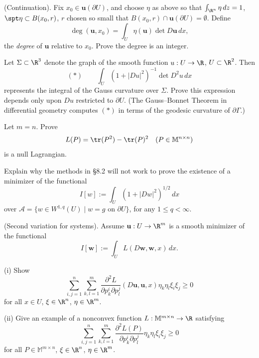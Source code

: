 \begin{exercise}
(Continuation). Fix $x_0 \in \mathbf{u}(\partial U)$, and choose $\eta$ as above so that $\int_{\R^n} \eta\, dz = 1$, $\spt \eta \subset B(x_0, r)$, $r$ chosen so small that $B(x_0, r) \cap \mathbf{u}(\partial U) = \emptyset$. Define
\[
\deg(\mathbf{u}, x_0) = \int_U \eta(\mathbf{u}) \det D\mathbf{u}\, dx,
\]
the \textit{degree} of $\mathbf{u}$ relative to $x_0$. Prove the degree is an integer.
\end{exercise}

\begin{exercise}
Let $\Sigma \subset \R^3$ denote the graph of the smooth function $u : U \to \R$, $U \subset \R^2$. Then
\[
(*) \qquad \int_U (1 + |Du|^2)^{-1} \det D^2u\, dx
\]
represents the integral of the Gauss curvature over $\Sigma$. Prove this expression depends only upon $Du$ restricted to $\partial U$. (The Gauss--Bonnet Theorem in differential geometry computes $(*)$ in terms of the geodesic curvature of $\partial\Gamma$.)
\end{exercise}

\begin{exercise}
Let $m = n$. Prove
\[
L(P) = \tr(P^2) - \tr(P)^2 \quad (P \in \mathbb{M}^{n \times n})
\]
is a null Lagrangian.
\end{exercise}

\begin{exercise}
Explain why the methods in \S8.2 will not work to prove the existence of a minimizer of the functional
\[
I[w] := \int_U (1 + |Dw|^2)^{1/2}\, dx
\]
over $\mathcal{A} = \{w \in W^{1,q}(U) \mid w = g \text{ on } \partial U\}$, for any $1 \le q < \infty$.
\end{exercise}

\begin{exercise}
(Second variation for systems). Assume $\mathbf{u} : U \to \R^m$ is a smooth minimizer of the functional
\[
I[\mathbf{w}] := \int_U L(D\mathbf{w}, \mathbf{w}, x)\, dx.
\]

(i) Show
\[
\sum_{i,j=1}^n \sum_{k,l=1}^m \frac{\partial^2 L}{\partial p_k^i \partial p_l^j}(D\mathbf{u}, \mathbf{u}, x)\eta_k \eta_l \xi_i \xi_j \ge 0
\]
for all $x \in U$, $\xi \in \R^n$, $\eta \in \R^m$.

(ii) Give an example of a nonconvex function $L : \mathbb{M}^{m \times n} \to \R$ satisfying
\[
\sum_{i,j=1}^n \sum_{k,l=1}^m \frac{\partial^2 L(P)}{\partial p_k^i \partial p_l^j} \eta_k \eta_l \xi_i \xi_j \ge 0
\]
for all $P \in \mathbb{M}^{m \times n}$, $\xi \in \R^n$, $\eta \in \R^m$.
\end{exercise}

